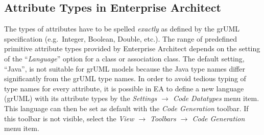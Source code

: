 \documentclass[a4paper]{article}
\begin{document}
	\subsection{Attribute Types in Enterprise Architect}
	The types of attributes have to be spelled \emph{exactly} as defined by the grUML specification (e.g.\ Integer, Boolean, Double, etc.). The range of predefined primitive attribute types provided by Enterprise Architect depends on the setting of the ``\emph{Language}'' option for a class or association class. The default setting, ``Java'', is not suitable for grUML models because the Java type names differ significantly from the grUML type names. In order to avoid tedious typing of type names for every attribute, it is possible in EA to define a new language (grUML) with its attribute types by the \emph{Settings $\rightarrow$ Code Datatypes} menu item. This language can then be set as default with the \emph{Code Generation} toolbar. If this toolbar is not visible, select the \emph{View $\rightarrow$ Toolbars $\rightarrow$ Code Generation} menu item.
	
\end{document}
